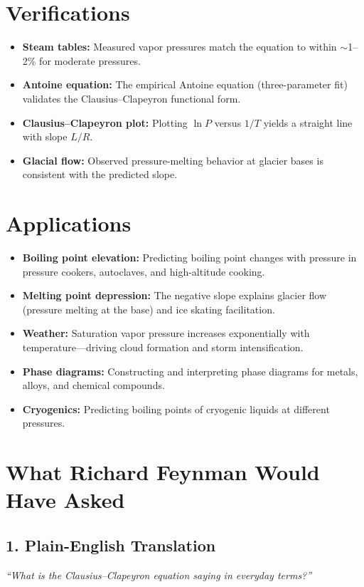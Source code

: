 \section*{Verifications}

\begin{itemize}
\item \textbf{Steam tables:} Measured vapor pressures match the equation to within $\sim$1--2\% for moderate pressures.
\item \textbf{Antoine equation:} The empirical Antoine equation (three-parameter fit) validates the Clausius--Clapeyron functional form.
\item \textbf{Clausius--Clapeyron plot:} Plotting $\ln P$ versus $1/T$ yields a straight line with slope $L/R$.
\item \textbf{Glacial flow:} Observed pressure-melting behavior at glacier bases is consistent with the predicted slope.
\end{itemize}
\section*{Applications}

\begin{itemize}
\item \textbf{Boiling point elevation:} Predicting boiling point changes with pressure in pressure cookers, autoclaves, and high-altitude cooking.
\item \textbf{Melting point depression:} The negative slope explains glacier flow (pressure melting at the base) and ice skating facilitation.
\item \textbf{Weather:} Saturation vapor pressure increases exponentially with temperature---driving cloud formation and storm intensification.
\item \textbf{Phase diagrams:} Constructing and interpreting phase diagrams for metals, alloys, and chemical compounds.
\item \textbf{Cryogenics:} Predicting boiling points of cryogenic liquids at different pressures.
\end{itemize}
\section*{What Richard Feynman Would Have Asked}

\subsection*{1. Plain-English Translation}
\textit{``What is the Clausius--Clapeyron equation saying in everyday terms?''}

